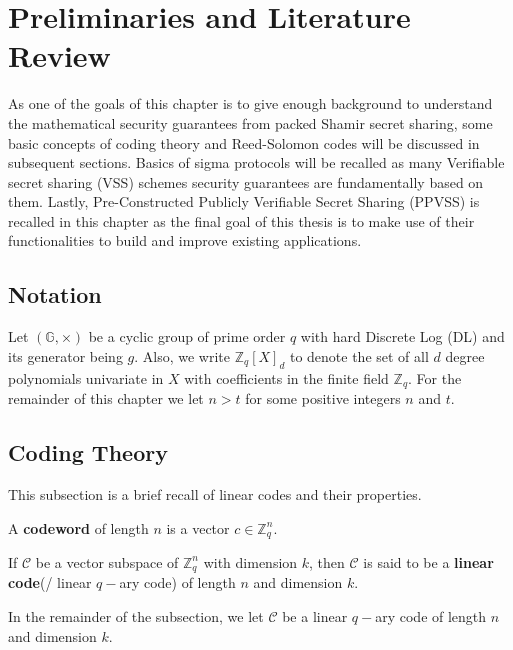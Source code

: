 \chapter{Preliminaries and Literature Review}
\label{chap:preliminaries}

As one of the goals of this chapter is to give enough background to understand the mathematical 
security guarantees from packed Shamir secret sharing, some basic concepts of coding theory 
and Reed-Solomon codes will be discussed in subsequent sections. Basics of sigma protocols 
will be recalled as many Verifiable secret sharing (VSS) schemes security guarantees 
are fundamentally based on them. Lastly, Pre-Constructed Publicly Verifiable Secret Sharing (PPVSS) 
is recalled in this chapter as the final goal of this thesis is to make use of their 
functionalities to build and improve existing applications.

\section{Notation}
Let $(\mathbb{G},\times)$ be a cyclic group of prime order $q$ with hard Discrete Log (DL) and its generator 
being $g$. 
Also, we write $\mathbb{Z}_{q}[X]_d$ to denote the set of all $d$ degree 
polynomials univariate in $X$ with coefficients in the finite field $\mathbb{Z}_q$. For the remainder of this 
chapter we let $n>t$ for some positive integers $n$ and $t$.

\section{Coding Theory}
\label{sec:linear-codes}
This subsection is a brief recall of linear codes and their properties.

\begin{definition}[Codeword]
  A \textbf{codeword} of length $n$ is a vector $c\in \mathbb{Z}_q^n$.
\end{definition}

\begin{definition}\cite{gallian2024contemporary}
  If $\mathcal{C}$ be a vector subspace of $\mathbb{Z}_q^n$ with dimension $k$, then $\mathcal{C}$ is 
  said to be a \textbf{linear code}(/ linear $q-$ary code) of length $n$ and dimension $k$.
\end{definition}

In the remainder of the subsection, we let $\mathcal{C}$ be a linear $q-$ary code of length $n$ and 
dimension $k$.

